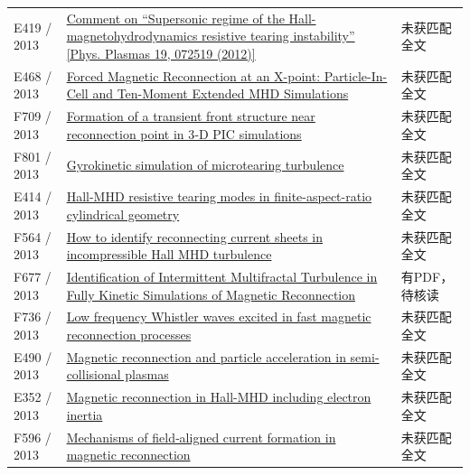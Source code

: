 \begin{longtable}{P{24mm}P{97mm}P{27mm}}
E419 / 2013 & \href{https://doi.org/10.1063/1.4789449}{Comment on “Supersonic regime of the Hall-magnetohydrodynamics resistive tearing instability” [Phys. Plasmas 19,  072519 (2012)]} & 未获匹配全文\\

E468 / 2013 & \href{http://ui.adsabs.harvard.edu/abs/2013AGUFMSH13A2039W/abstract}{Forced Magnetic Reconnection at an X-point: Particle-In-Cell and Ten-Moment Extended MHD Simulations} & 未获匹配全文\\

F709 / 2013 & \href{https://doi.org/10.1002/jgra.50136}{Formation of a transient front structure near reconnection point in 3‐D PIC simulations} & 未获匹配全文\\

F801 / 2013 & \href{https://doi.org/10.18725/oparu-2600}{Gyrokinetic simulation of microtearing turbulence} & 未获匹配全文\\

E414 / 2013 & \href{http://absimage.aps.org/image/DPP13/MWS_DPP13-2013-001107.pdf}{Hall-MHD resistive tearing modes in finite-aspect-ratio cylindrical geometry} & 未获匹配全文\\

F564 / 2013 & \href{https://doi.org/10.1002/jgra.50442}{How to identify reconnecting current sheets in incompressible Hall MHD turbulence} & 未获匹配全文\\

F677 / 2013 & \href{https://doi.org/10.1103/physrevlett.110.205002}{Identification of Intermittent Multifractal Turbulence in Fully Kinetic Simulations of Magnetic Reconnection} & 有PDF，待核读\\

F736 / 2013 & \href{https://doi.org/10.1007/s11467-013-0369-x}{Low frequency Whistler waves excited in fast magnetic reconnection processes} & 未获匹配全文\\

E490 / 2013 & \href{https://research.manchester.ac.uk/en/studentTheses/26c3b17d-87ca-4d98-b5b5-3a3d78e0dd03}{Magnetic reconnection and particle acceleration in semi-collisional plasmas} & 未获匹配全文\\

E352 / 2013 & \href{https://ui.adsabs.harvard.edu/abs/2013AGUFMSH51B2092G/abstract}{Magnetic reconnection in Hall-MHD including electron inertia} & 未获匹配全文\\

F596 / 2013 & \href{https://doi.org/10.1002/jgra.50457}{Mechanisms of field‐aligned current formation in magnetic reconnection} & 未获匹配全文\\


\end{longtable}
